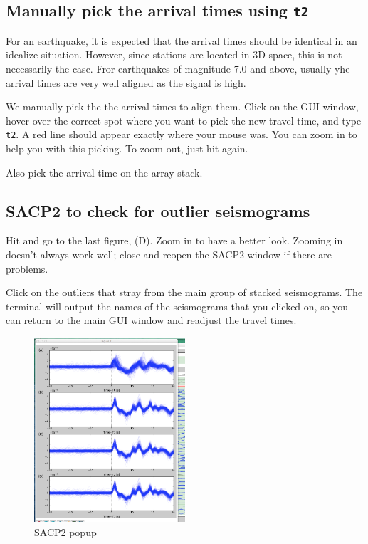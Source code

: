 \documentclass[letterpaper,10pt]{article}
\begin{document}

\subsection{Manually pick the arrival times using \texttt{t2}}

For an earthquake, it is expected that the arrival times should be identical in an idealize situation. However, since stations are located in 3D space, this is not necessarily the case. Fror earthquakes of magnitude 7.0 and above, usually yhe arrival times are very well aligned as the signal is high.

We manually pick the the arrival times to align them. Click on the GUI window, hover over the correct spot where you want to pick the new travel time, and type \texttt{t2}. A red line should appear exactly where your mouse was. You can zoom in to help you with this picking. To zoom out, just hit  again.

Also pick the arrival time on the array stack. 


\subsection{SACP2 to check for outlier seismograms}

Hit  and go to the last figure, (D). Zoom in to have a better look. Zooming in doesn't always work well; close and reopen the SACP2 window if there are problems. 

Click on the outliers that stray from the main group of stacked seismograms. The terminal will output the names of the seismograms that you clicked on, so you can return to the main GUI window and readjust the travel times.

\begin{figure}[h!]
  \centering
  \includegraphics[width=0.5\textwidth]{images/SACP2_popup}
  \caption{SACP2 popup}
  \label{fig:SACP2_popup}
\end{figure}
\end{document}
